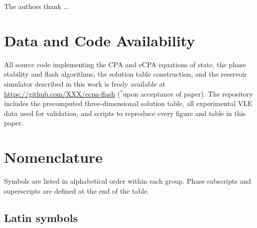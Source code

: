 \documentclass[preprint,12pt,authoryear]{elsarticle}
\begin{document}
The authors thank \ldots

\newpage




\section*{Data and Code Availability}

All source code implementing the CPA and eCPA equations of state,
the phase stability and flash algorithms, the solution table construction,
and the reservoir simulator described in this work is freely available at
\url{https://github.com/XXX/ecpa-flash} ($^\ast$upon acceptance of paper).
The repository includes the precomputed three-dimensional solution table,
all experimental VLE data used for validation, and scripts to reproduce
every figure and table in this paper.





\appendix
\setcounter{section}{0}
\setcounter{figure}{0}
\renewcommand{\thesection}{S\arabic{section}}
\renewcommand{\thesubsection}{S\arabic{section}.\arabic{subsection}}
\renewcommand{\thefigure}{S\arabic{figure}}

\section{Nomenclature}
\label{sec:nomenclature}

\noindent Symbols are listed in alphabetical order within each group.
Phase subscripts and superscripts are defined at the end of the table.

\subsection*{Latin symbols}
\end{document}
